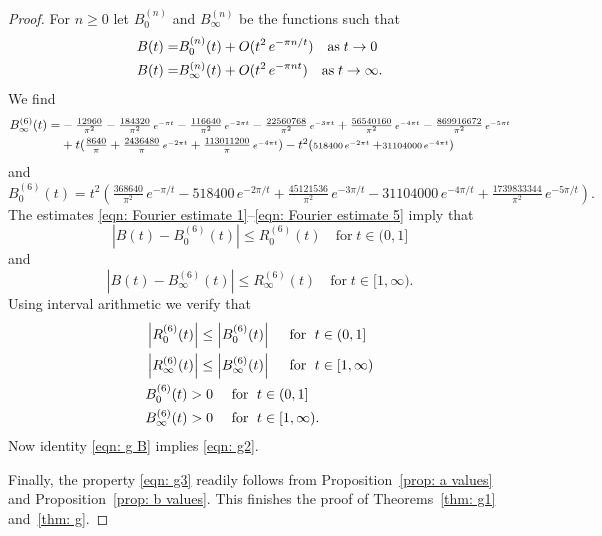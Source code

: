 \begin{proof}
  \noindent For $n\geq 0$ let $B_0^{(n)}$ and  $B_{\infty}^{(n)}$ be the functions  such that
  \begin{align}
   B(t)=&B_0^{(n)}(t)+O(t^2\,e^{-\pi n /t})\quad\mbox{as}\;t\to0\notag\\
   B(t)=&B_\infty^{(n)}(t)+O(t^2\,e^{-\pi n t})\quad\mbox{as}\;t\to\infty.\notag
  \end{align}
  We find
  \begin{align}B_\infty^{(6)}(t)=&-\tfrac{12960}{\pi ^2}-\tfrac{184320}{\pi ^2}\,\scriptstyle e^{-\pi  t}\displaystyle-\tfrac{116640}{\pi ^2} \,\scriptstyle e^{-2\pi  t}\displaystyle-\tfrac{22560768}{\pi ^2}\,\scriptstyle e^{-3\pi  t}\displaystyle+\tfrac{56540160}{\pi ^2}\,\scriptstyle e^{-4\pi  t}\displaystyle-\tfrac{869916672 }{\pi ^2} \,\scriptstyle e^{-5\pi  t}\displaystyle\notag\\
  &+t(\tfrac{8640 }{\pi }+\tfrac{2436480}{\pi }\,\scriptstyle e^{-2\pi  t}\displaystyle+\tfrac{113011200 }{\pi }\,\scriptstyle e^{-4\pi  t}\textstyle)-t^2(\scriptstyle518400\,\scriptstyle e^{-2\pi  t}\displaystyle+\scriptstyle31104000\,\scriptstyle e^{-4\pi  t}\displaystyle)\notag
  \end{align}
  and
  $$B_0^{(6)}(t)= t^2(\tfrac{368640}{\pi ^2}\, e^{-\pi/t}-518400\, e^{-2 \pi /t}+\tfrac{45121536 }{\pi ^2}\,e^{-3 \pi/t}-31104000\, e^{-4 \pi/t}+\tfrac{1739833344 }{\pi ^2}\,e^{-5 \pi/t}) .$$
  The estimates \eqref{eqn: Fourier estimate 1}--\eqref{eqn: Fourier estimate 5} imply that $$\left|B(t)-B_0^{(6)}(t)\right|\leq R_0^{(6)}(t)\quad\mbox{for}\;t\in(0,1]$$
  and
  $$\left|B(t)-B_\infty^{(6)}(t)\right|\leq R_\infty^{(6)}(t)\quad\mbox{for}\;t\in[1,\infty).$$
  Using interval arithmetic we verify that
  \begin{align}
  &\left|R_0^{(6)}(t)\right|\leq\left|B_0^{(6)}(t)\right|\quad\mbox{ for }\;t\in(0,1]\notag \\
  &\left|R_\infty^{(6)}(t)\right|\leq\left|B_\infty^{(6)}(t)\right|\quad\mbox{ for }\;t\in[1,\infty)\notag \\
  &B_0^{(6)}(t)>0\quad\mbox{ for }\;t\in(0,1]\notag \\
  &B_\infty^{(6)}(t)>0\quad\mbox{ for }\;t\in[1,\infty). \notag
  \end{align}
  Now identity \eqref{eqn: g B} implies \eqref{eqn: g2}.

  Finally, the property \eqref{eqn: g3} readily follows from Proposition~\ref{prop: a values} and Proposition~\ref{prop: b values}.
  This finishes the proof of Theorems~\ref{thm: g1} and~\ref{thm: g}.
   \end{proof}




